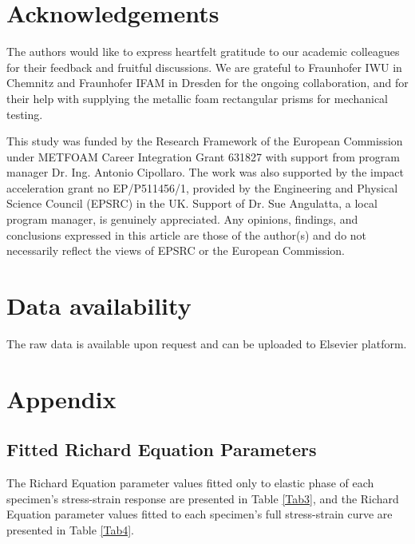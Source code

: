 \documentclass[review]{elsarticle}
\begin{document}
{{\section*{Acknowledgements}

The authors would like to express heartfelt gratitude to our academic colleagues for their feedback and fruitful discussions. We are grateful to Fraunhofer IWU in Chemnitz and Fraunhofer IFAM in Dresden for the ongoing collaboration, and for their help with supplying the metallic foam rectangular prisms for mechanical testing.

This study was funded by the Research Framework of the European Commission under METFOAM Career Integration Grant 631827 with support from program manager Dr. Ing. Antonio Cipollaro. The work was also supported by the impact acceleration grant no EP/P511456/1, provided by the Engineering and Physical Science Council (EPSRC) in the UK. Support of Dr. Sue Angulatta, a local program manager, is genuinely appreciated. Any opinions, findings, and conclusions expressed in this article are those of the author(s) and do not necessarily reflect the views of EPSRC or the European Commission. 


\section*{Data availability}

The raw data is available upon request and can be uploaded to Elsevier platform.



\section*{Appendix}

\subsection*{Fitted Richard Equation Parameters}

The Richard Equation parameter values fitted only to elastic phase of each specimen’s stress-strain response are presented in Table \ref{Tab3}, and the Richard Equation parameter values fitted to each specimen’s full stress-strain curve are presented in Table \ref{Tab4}.

\begin{landscape}



\end{landscape}}}
\end{document}
